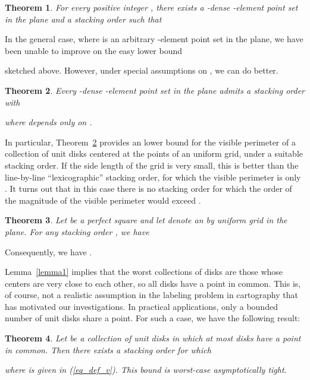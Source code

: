 \documentclass[11pt]{article}
\newtheorem{thm}{Theorem}             \newtheorem{lem}[thm]{Lemma}
\begin{document}
\begin{thm}\label{theorem3} For every positive integer , there exists a -dense -element point set  in the plane and a stacking order  such that

\end{thm}

In the general case, where  is an arbitrary -element point set in the plane, we have been unable to improve on the easy lower bound

sketched above. However, under special assumptions on , we can do better.

\begin{thm}\label{theorem4} Every -dense -element point set  in the plane admits a stacking order  with

where  depends only on .
\end{thm}

In particular, Theorem~\ref{theorem4} provides an  lower bound for the
visible perimeter of a collection of  unit disks centered at the points of
an  uniform grid, under
a suitable stacking order. If the side length of the grid is very small, this is
better than the line-by-line ``lexicographic'' stacking order, for which the
visible perimeter is only . It turns out that
in this case there is no stacking order for which the order of the magnitude
of the visible perimeter would exceed .

\begin{thm}\label{theorem5}
Let  be a perfect square and let  denote an  by  uniform grid in the plane. For any stacking order , we have

\end{thm}

Consequently, we have .

Lemma~\ref{lemma1} implies that the worst collections of disks are those whose centers are very close to each other, so all disks have a point in common. This is, of course, not a
realistic assumption in the labeling problem in cartography that has motivated
our investigations. In practical applications, only a bounded number of unit
disks share a point. For such a case, we have the following result:

\begin{thm}\label{thm_bounded_overlap}
Let  be a collection of  unit disks in which at most  disks have a point in common. Then there exists a stacking order  for which

where  is given in (\ref{eq_def_v}). This bound is worst-case asymptotically tight.
\end{thm}
\end{document}
